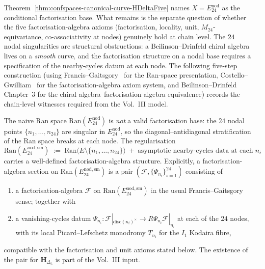 Theorem~\ref{thm:confspaces-canonical-curve-HDeltaFive} names
$X = E^{\mathrm{nod}}_{24}$ as the conditional factorisation base. What
remains is the separate question of whether the five
factorisation-algebra axioms
(factorisation, locality, unit, $M_{24}$-equivariance, co-associativity
at nodes) genuinely hold at chain level.
The $24$ nodal singularities are structural obstructions: a
Beilinson--Drinfeld chiral algebra lives on a \emph{smooth} curve, and
the factorisation structure on a nodal base requires a specification of
the nearby-cycles datum at each node. The following five-step
construction (using Francis--Gaitsgory~\cite{FrancisGaitsgory2011}
for the Ran-space presentation, Costello--Gwilliam~\cite{CG17} for the
factorisation-algebra axiom system, and Beilinson--Drinfeld~\cite{BD04}
Chapter~3 for the chiral-algebra--factorisation-algebra equivalence)
records the chain-level witnesses required from the Vol.~III model.

\begin{proposition}
\label{prop:confspaces-ran-space-nod-smooth-regularisation}
\ClaimStatusConditional
The naive Ran space $\mathrm{Ran}(E^{\mathrm{nod}}_{24})$ is
\emph{not} a valid factorisation base: the $24$ nodal points
$\{n_1,\ldots,n_{24}\}$ are singular in $E^{\mathrm{nod}}_{24}$, so the
diagonal--antidiagonal stratification of the Ran space breaks at each
node. The regularisation
\[
 \mathrm{Ran}(E^{\mathrm{nod,sm}}_{24})
 \;:=\;
 \mathrm{Ran}\bigl(E\setminus\{n_1,\ldots,n_{24}\}\bigr)
 \;+\;
 \text{asymptotic nearby-cycles data at each }n_i
\]
carries a well-defined factorisation-algebra structure. Explicitly, a
factorisation-algebra section on
$\mathrm{Ran}(E^{\mathrm{nod,sm}}_{24})$ is a pair $(\mathcal{F},
\{\Psi_{n_i}\}_{i=1}^{24})$ consisting of
\begin{enumerate}[label=\textup{(\alph*)},leftmargin=2em]
\item a factorisation-algebra $\mathcal{F}$ on
 $\mathrm{Ran}(E^{\mathrm{nod,sm}}_{24})$ in the usual
 Francis--Gaitsgory sense; together with
\item a vanishing-cycles datum
 $\Psi_{n_i}\colon \mathcal{F}|_{\text{disc}(n_i)^\times}
 \to R\Psi_{n_i}\mathcal{F}|_{n_i}$
 at each of the $24$ nodes, with its local Picard--Lefschetz monodromy
 $T_{n_i}$ for the $I_1$ Kodaira fibre,
\end{enumerate}
compatible with the factorisation and unit axioms stated below. The
existence of the pair for $\mathbf H_{\Delta_5}$ is part of the
Vol.~III input.
\end{proposition}

